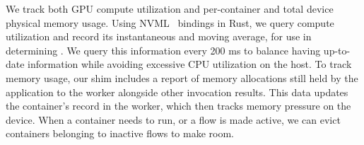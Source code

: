 We track both GPU compute utilization and per-container and total device physical memory usage.
Using NVML~\cite{nvml} bindings in Rust, we query compute utilization and record its instantaneous and moving average, for use in determining \D.
We query this information every 200 ms to balance having up-to-date information while avoiding excessive CPU utilization on the host.
To track memory usage, our shim includes a report of memory allocations still held by the application to the worker alongside other invocation results. 
This data updates the container's record in the worker, which then tracks memory pressure on the device.
When a container needs to run, or a flow is made active, we can evict containers belonging to inactive flows to make room.
